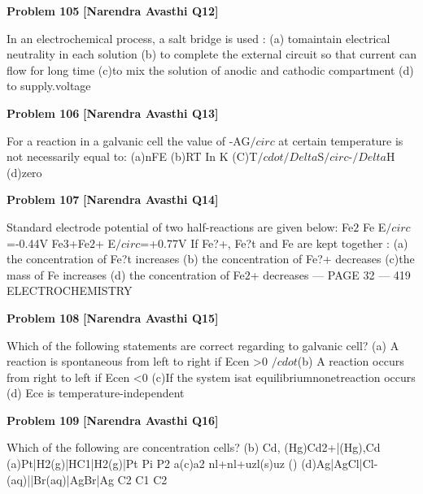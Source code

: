 \begin{problembox}
\textbf{Problem 105} \hfill \textbf{[Narendra Avasthi Q12]}
\label{q:ext-narendra_avasthi_all_questions-105}

In an electrochemical process, a salt bridge is used :
(a) tomaintain electrical neutrality in each solution
(b) to complete the external circuit so that current can flow for long time
(c)to mix the solution of anodic and cathodic compartment
(d) to supply.voltage
\end{problembox}

\begin{problembox}
\textbf{Problem 106} \hfill \textbf{[Narendra Avasthi Q13]}
\label{q:ext-narendra_avasthi_all_questions-106}

For a reaction in a galvanic cell the value of -AG$/circ$ at certain temperature is not necessarily
equal to:
(a)nFE
(b)RT In K
(C)T$/cdot$$/Delta$S$/circ$-$/Delta$H
(d)zero
\end{problembox}

\begin{problembox}
\textbf{Problem 107} \hfill \textbf{[Narendra Avasthi Q14]}
\label{q:ext-narendra_avasthi_all_questions-107}

Standard electrode potential of two half-reactions are given below:
Fe$2$ Fe
E$/circ$=-0.44V
Fe3+Fe$2$+
E$/circ$=+0.77V
If Fe?+, Fe?t and Fe are kept together :
(a) the concentration of Fe?t increases
(b) the concentration of Fe?+ decreases
(c)the mass of Fe increases
(d) the concentration of Fe$2$+ decreases
--- PAGE 32 ---
419
ELECTROCHEMISTRY
\end{problembox}

\begin{problembox}
\textbf{Problem 108} \hfill \textbf{[Narendra Avasthi Q15]}
\label{q:ext-narendra_avasthi_all_questions-108}

Which of the following statements are correct regarding to galvanic cell?
(a) A reaction is spontaneous from left to right if Ecen >0
$/cdot$(b) A reaction occurs from right to left if Ecen <0
(c)If the system isat equilibriumnonetreaction occurs
(d) Ece is temperature-independent
\end{problembox}

\begin{problembox}
\textbf{Problem 109} \hfill \textbf{[Narendra Avasthi Q16]}
\label{q:ext-narendra_avasthi_all_questions-109}

Which of the following are concentration cells?
(b) Cd, (Hg)Cd2+|(Hg),Cd
(a)Pt|H2(g)|HC1|H2(g)|Pt
Pi
P2
a(c)a2
nl+nl+uzl(s)uz ()
(d)Ag|AgCl|Cl-(aq)||Br(aq)|AgBr|Ag
C2
C1
C2
\end{problembox}

